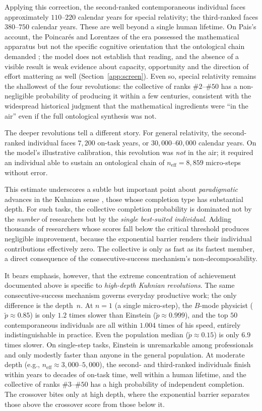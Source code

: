 \documentclass{article}
\begin{document}
Applying this correction, the second-ranked contemporaneous individual
faces approximately $110$--$220$ calendar years for special relativity;
the third-ranked faces $380$--$750$ calendar years. These are well
beyond a single human lifetime. On Pais's account, the Poincar\'{e}s and Lorentzes of the era possessed the mathematical apparatus but not the specific cognitive orientation that the ontological chain demanded \cite{pais1982subtle}; the model does not establish that reading, and the absence of a visible result is weak evidence about capacity, opportunity and the direction of effort mattering as well (Section~\ref{app:screen}).
Even so, special relativity remains the shallowest of the four
revolutions: the collective of ranks $\#2$--$\#50$ has a non-negligible
probability of producing it within a few centuries, consistent with the
widespread historical judgment that the mathematical ingredients were
``in the air'' even if the full ontological synthesis was not.

The deeper revolutions tell a different story. For general relativity,
the second-ranked individual faces $7{,}200$ on-task years, or
$30{,}000$--$60{,}000$ calendar years. On the model's illustrative calibration, this revolution was \emph{not} in the air; it required an individual able to sustain an
ontological chain of $n_{\mathrm{eff}} = 8{,}859$ micro-steps without
error.

This estimate underscores a subtle but important point about
\emph{paradigmatic} advances in the Kuhnian sense \cite{kuhn1970structure},
those whose completion type has substantial depth. For such tasks, the
collective completion probability is dominated not by the \emph{number} of
researchers but by the \emph{single best-suited individual}. Adding
thousands of researchers whose scores fall below the critical threshold
produces negligible improvement, because the exponential barrier renders
their individual contributions effectively zero. The collective is only
as fast as its fastest member, a direct consequence of the
consecutive-success mechanism's non-decomposability.

It bears emphasis, however, that the extreme concentration of
achievement documented above is specific to \emph{high-depth Kuhnian
revolutions}. The same consecutive-success mechanism governs everyday
productive work; the only difference is the depth~$n$. At $n = 1$ (a
single micro-step), the $B$-mode physicist ($\widetilde{p} \approx
0.85$) is only $1.2$ times slower than Einstein ($\widetilde{p} \approx
0.999$), and the top $50$ contemporaneous individuals are all within
$1.004$ times of his speed, entirely indistinguishable in practice. Even
the population median ($\widetilde{p} \approx 0.15$) is only $6.9$ times
slower. On single-step tasks, Einstein is unremarkable among
professionals and only modestly faster than anyone in the general
population. At moderate depth (e.g., $n_{\mathrm{eff}} \approx
3{,}000$--$5{,}000$), the second- and third-ranked individuals finish
within years to decades of on-task time, well within a human lifetime,
and the collective of ranks $\#3$--$\#50$ has a high probability of
independent completion. The crossover bites only at high depth,
where the exponential barrier separates those above the crossover score
from those below it.
\end{document}
